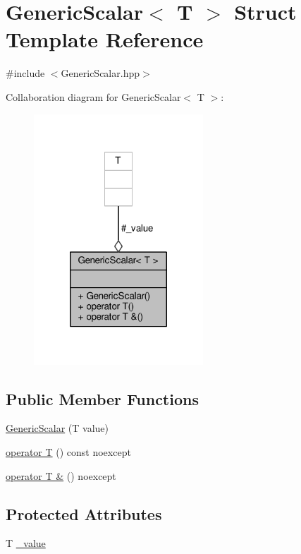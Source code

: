 \hypertarget{struct_generic_scalar}{\section{Generic\-Scalar$<$ T $>$ Struct Template Reference}
\label{struct_generic_scalar}
}


{\ttfamily \#include $<$Generic\-Scalar.\-hpp$>$}



Collaboration diagram for Generic\-Scalar$<$ T $>$\-:
\nopagebreak
\begin{figure}[H]
\begin{center}
\leavevmode
\includegraphics[width=180pt]{struct_generic_scalar__coll__graph}
\end{center}
\end{figure}
\subsection*{Public Member Functions}
\begin{DoxyCompactItemize}
\item 
\hyperlink{struct_generic_scalar_aaabb6f012a3d829348c318e14b6dc551}{Generic\-Scalar} (T value)
\item 
\hyperlink{struct_generic_scalar_ae1346acd021b8f259e58723350d26729}{operator T} () const noexcept
\item 
\hyperlink{struct_generic_scalar_a4d146d4dce6f936e42211a6528cc9775}{operator T \&} () noexcept
\end{DoxyCompactItemize}
\subsection*{Protected Attributes}
\begin{DoxyCompactItemize}
\item 
T \hyperlink{struct_generic_scalar_a27d311e2bdb13149160fa258d46bcfe3}{\-\_\-value}
\end{DoxyCompactItemize}


